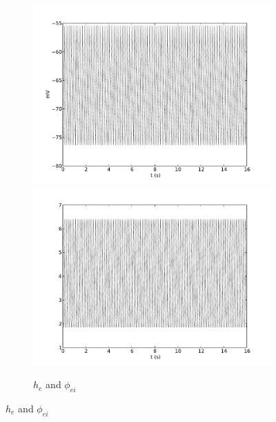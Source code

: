 \documentclass[a4paper,12pt]{article}
\begin{document}
\begin{figure}
	\begin{subfigure}[b]{1\textwidth}
		\includegraphics[scale=0.32]{frontiers-2012-images-revised/biphasic-gamma_yml-00214_ode-phi-burst-split-v-1-0_2-5-0_5_yml-he-phi.pdf}
		\includegraphics[scale=0.32]{frontiers-2012-images-revised/biphasic-gamma_yml-00214_ode-phi-burst-split-v-1-0_2-5-0_5_yml-phi_ei-phi.pdf}
		\caption{$h_e$ and $\phi_{ei}$}
	\end{subfigure}


\end{figure}
\end{document}
